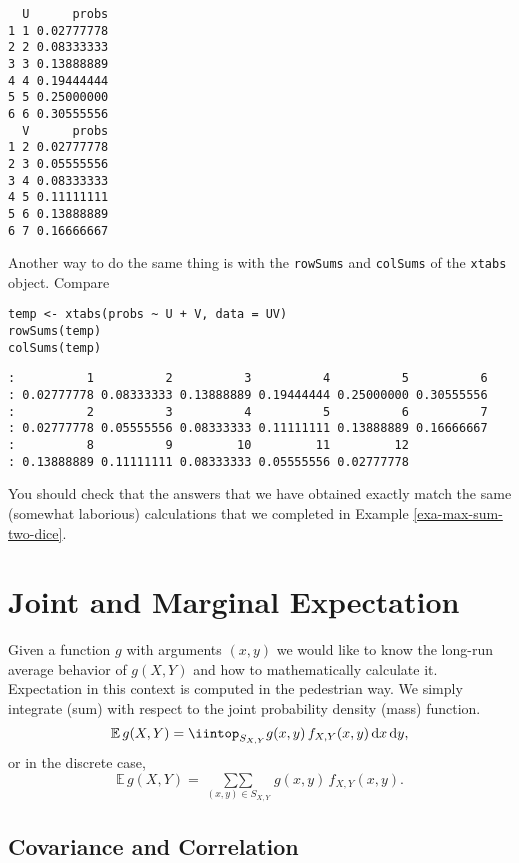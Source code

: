 \begin{verbatim}
  U      probs
1 1 0.02777778
2 2 0.08333333
3 3 0.13888889
4 4 0.19444444
5 5 0.25000000
6 6 0.30555556
  V      probs
1 2 0.02777778
2 3 0.05555556
3 4 0.08333333
4 5 0.11111111
5 6 0.13888889
6 7 0.16666667
\end{verbatim}

Another way to do the same thing is with the \texttt{rowSums} and \texttt{colSums}
of the \texttt{xtabs} object. Compare

\begin{verbatim}
temp <- xtabs(probs ~ U + V, data = UV)
rowSums(temp)
colSums(temp)
\end{verbatim}

\begin{verbatim}
:          1          2          3          4          5          6 
: 0.02777778 0.08333333 0.13888889 0.19444444 0.25000000 0.30555556
:          2          3          4          5          6          7
: 0.02777778 0.05555556 0.08333333 0.11111111 0.13888889 0.16666667 
:          8          9         10         11         12
: 0.13888889 0.11111111 0.08333333 0.05555556 0.02777778
\end{verbatim}

You should check that the answers that we have obtained exactly match
the same (somewhat laborious) calculations that we completed in
Example \ref{exa-max-sum-two-dice}.

\section{Joint and Marginal Expectation}
\label{sec-7-2}

Given a function \(g\) with arguments \((x,y)\) we would like to know
the long-run average behavior of \(g(X,Y)\) and how to mathematically
calculate it. Expectation in this context is computed in the
pedestrian way. We simply integrate (sum) with respect to the joint
probability density (mass) function.
\begin{equation}
\mathbb{E}\, g(X,Y)=\iintop_{S_{X,Y}}g(x,y)\, f_{X,Y}(x,y)\,\mathrm{d} x\,\mathrm{d} y,
\end{equation}
or in the discrete case,
\begin{equation}
\mathbb{E}\, g(X,Y)=\mathop{\sum\sum}\limits _{(x,y)\in S_{X,Y}}g(x,y)\, f_{X,Y}(x,y).
\end{equation}

\subsection{Covariance and Correlation}
\label{sec-7-2-1}

